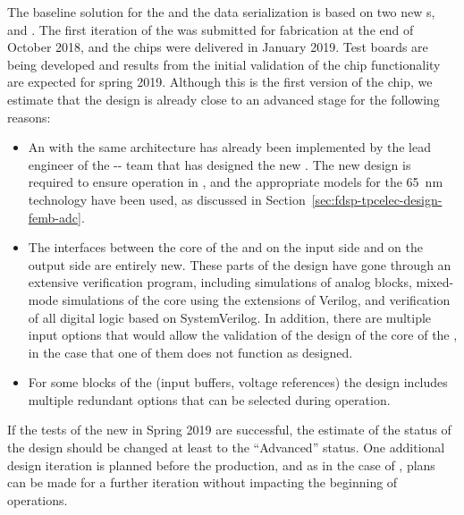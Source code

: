 The baseline solution for the  and the data serialization is based on two new 
s,  and .
The first iteration of the  was submitted for fabrication
at the end of October 2018, and the chips were delivered in January 2019.
Test boards are being developed and results from the initial validation of the
chip functionality are expected for spring 2019. Although this is the first version
of the chip, we estimate that the design is already close to an advanced stage
for the following reasons:
\begin{itemize}
\item{An  with the same architecture has already been implemented by the
lead engineer of the -- team that has designed the new .
The new design is required to ensure operation in \lar, and the appropriate
models for the \SI{65}{nm} technology have been used, as discussed in
Section~\ref{sec:fdsp-tpcelec-design-femb-adc}.}
\item{The interfaces between the core of the  and  on 
the input side and  on the output side are entirely new.
These parts of the design have gone through an extensive verification
program, including  simulations of analog blocks,
mixed-mode simulations of the core  using the 
extensions of Verilog, and  verification of 
all digital logic based on SystemVerilog. In addition, there are multiple 
input options that would allow the validation of the design of the core 
of the , in the case that one of them does not function as designed.}
\item{For some blocks of the  (input buffers, voltage references) the
design includes multiple redundant options that can be selected during 
operation.}
\end{itemize}
If the tests of the new  in Spring 2019 are successful, the
estimate of the status of the design should be changed at least to the 
``Advanced'' status. One additional design iteration is planned before
the production, and as in the case of , plans can be made for a
further iteration without impacting the beginning of  operations.

